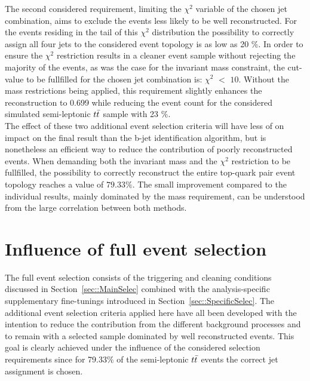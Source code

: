 The second considered requirement, limiting the $\chi^{2}$ variable of the chosen jet combination, aims to exclude the events less likely to be well reconstructed.
For the events residing in the tail of this $\chi^{2}$ distribution the possibility to correctly assign all four jets to the considered event topology is as low as 20 $\%$.
In order to ensure the $\chi^{2}$ restriction results in a cleaner event sample without rejecting the majority of the events, as was the case for the invariant mass constraint, the cut-value to be fullfilled for the chosen jet combination is: $\chi^{2}$ $<$ $10$.
Without the mass restrictions being applied, this requirement slightly enhances the reconstruction to 0.699 while reducing the event count for the considered simulated semi-leptonic $t\bar{t}$ sample with 23 $\%$.
\\

The effect of these two additional event selection criteria will have less of on impact on the final result than the b-jet identification algorithm, but is nonetheless an efficient way to reduce the contribution of poorly reconstructed events.
When demanding both the invariant mass and the $\chi^{2}$ restriction to be fullfilled, the possibility to correctly reconstruct the entire top-quark pair event topology reaches a value of $79.33\%$.
The small improvement compared to the individual results, mainly dominated by the mass requirement, can be understood from the large correlation between both methods.

\section{Influence of full event selection} %
The full event selection consists of the triggering and cleaning conditions discussed in Section~\ref{sec::MainSelec} combined with the analysis-specific supplementary fine-tunings introduced in Section~\ref{sec::SpecificSelec}.
The additional event selection criteria applied here have all been developed with the intention to reduce the contribution from the different background processes and to remain with a selected sample dominated by well reconstructed events.
This goal is clearly achieved under the influence of the considered selection requirements
since for 79.33$\%$ of the semi-leptonic $t\bar{t}$ events the correct jet assignment is chosen.
\\

